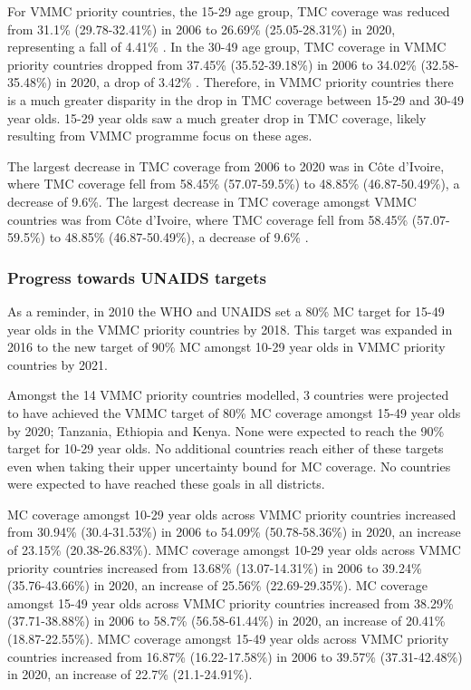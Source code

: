 \documentclass{article}
\begin{document}
For VMMC priority countries, the 15-29 age group, TMC coverage was reduced from 31.1\% (29.78-32.41\%) in 2006 to 26.69\% (25.05-28.31\%) in 2020, representing a fall of 4.41\% . In the 30-49 age group, TMC coverage in VMMC priority countries dropped from 37.45\% (35.52-39.18\%) in 2006 to 34.02\% (32.58-35.48\%) in 2020, a drop of 3.42\% . Therefore, in VMMC priority countries there is a much greater disparity in the drop in TMC coverage between 15-29 and 30-49 year olds. 15-29 year olds saw a much greater drop in TMC coverage, likely resulting from VMMC programme focus on these ages.

The largest decrease in TMC coverage from 2006 to 2020 was in Côte d'Ivoire, where TMC coverage fell from 58.45\% (57.07-59.5\%) to 48.85\% (46.87-50.49\%), a decrease of 9.6\%. The largest decrease in TMC coverage amongst VMMC countries was from Côte d'Ivoire, where TMC coverage fell from 58.45\% (57.07-59.5\%) to 48.85\% (46.87-50.49\%), a decrease of 9.6\% .


\subsubsection*{Progress towards UNAIDS targets}


As a reminder, in 2010 the WHO and UNAIDS set a 80\% MC target for 15-49 year olds in the VMMC priority countries by 2018. This target was expanded in 2016 to the new target of 90\% MC amongst 10-29 year olds in VMMC priority countries by 2021.

Amongst the 14 VMMC priority countries modelled, 3 countries were projected to have achieved the VMMC target of 80\% MC coverage amongst 15-49 year olds by 2020; Tanzania, Ethiopia and Kenya. None were expected to reach the 90\% target for 10-29 year olds. No additional countries reach either of these targets even when taking their upper uncertainty bound for MC coverage. No countries were expected to have reached these goals in all districts.

MC coverage amongst 10-29 year olds across VMMC priority countries increased from 30.94\% (30.4-31.53\%) in 2006 to 54.09\% (50.78-58.36\%) in 2020, an increase of 23.15\% (20.38-26.83\%). MMC coverage amongst 10-29 year olds across VMMC priority countries increased from 13.68\% (13.07-14.31\%) in 2006 to 39.24\% (35.76-43.66\%) in 2020, an increase of 25.56\% (22.69-29.35\%). MC coverage amongst 15-49 year olds across VMMC priority countries increased from 38.29\% (37.71-38.88\%) in 2006 to 58.7\% (56.58-61.44\%) in 2020, an increase of 20.41\% (18.87-22.55\%). MMC coverage amongst 15-49 year olds across VMMC priority countries increased from 16.87\% (16.22-17.58\%) in 2006 to 39.57\% (37.31-42.48\%) in 2020, an increase of 22.7\% (21.1-24.91\%).
\end{document}
